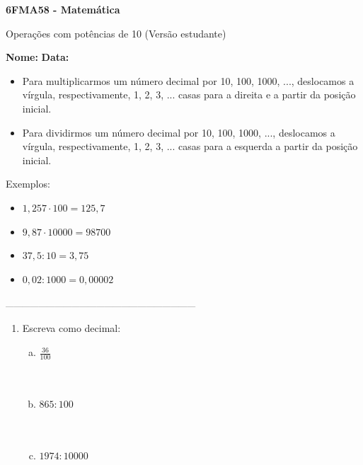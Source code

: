 \documentclass[a4paper,14pt]{article}
\begin{document}
	
	\noindent\textbf{6FMA58 - Matemática} 
	
	\begin{center}Operações com potências de 10 (Versão estudante)
	\end{center}
	
	\noindent\textbf{Nome:} \underline{\hspace{10cm}}
	\noindent\textbf{Data:} \underline{\hspace{4cm}}
	
	\begin{multicols}{2}
    		\noindent 
    		\begin{itemize}
    			\item Para multiplicarmos um número decimal por 10, 100, 1000, ..., deslocamos a vírgula, respectivamente, 1, 2, 3, ... casas para a direita e a partir da posição inicial.
    			\item Para dividirmos um número decimal por 10, 100, 1000, ..., deslocamos a vírgula, respectivamente, 1, 2, 3, ... casas para a esquerda a partir da posição inicial.
    		\end{itemize}
    		\noindent Exemplos:
    		\begin{itemize}
    			\item $1,257 \cdot 100 = 125,7$
    			\item $9,87 \cdot 10000 = 98700$
    			\item $37,5 : 10 = 3,75$
    			\item $0,02 : 1000 = 0,00002$
    		\end{itemize}
    		\textsubscript{---------------------------------------------------------------------}
    		\begin{enumerate}
    			\item Escreva como decimal:
    			\begin{enumerate}[a)]
    				\item $\frac{36}{100}$ \\\\\\
    				\item $865 : 100$ \\\\\\
    				\item $1974 : 10000$ \\\\\\

\end{enumerate}
\end{enumerate}
\end{multicols}
\end{document}
